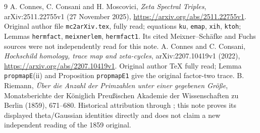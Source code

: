 \documentclass[11pt]{article}
\begin{document}
\begin{thebibliography}{9}
 A. Connes, C. Consani and H. Moscovici,
\emph{Zeta Spectral Triples}, arXiv:2511.22755v1 (27 November 2025),
\url{https://arxiv.org/abs/2511.22755v1}.
Original author file \texttt{mc2arXiv.tex}, fully read;
equations \texttt{ku}, \texttt{emap}, \texttt{xih}, \texttt{ktoh};
Lemmas \texttt{hermfact}, \texttt{meixnerlem}, \texttt{hermfact1}.
Its cited Meixner--Sch\"afke and Fuchs sources were not independently
read for this note.
 A. Connes and C. Consani,
\emph{Hochschild homology, trace map and zeta-cycles},
arXiv:2207.10419v1 (2022),
\url{https://arxiv.org/abs/2207.10419v1}.
Original author TeX fully read; Lemma \texttt{propmapE}(ii) and
Proposition \texttt{propmapE1} give the original factor-two trace.
 B. Riemann,
\emph{\"Uber die Anzahl der Primzahlen unter einer gegebenen Gr\"o\ss e},
Monatsberichte der K\"oniglich Preu\ss ischen Akademie der
Wissenschaften zu Berlin (1859), 671--680.
Historical attribution through \cite{CCM}; this note proves its
displayed theta/Gaussian identities directly and does not claim a
new independent reading of the 1859 original.
\end{thebibliography}
\end{document}
